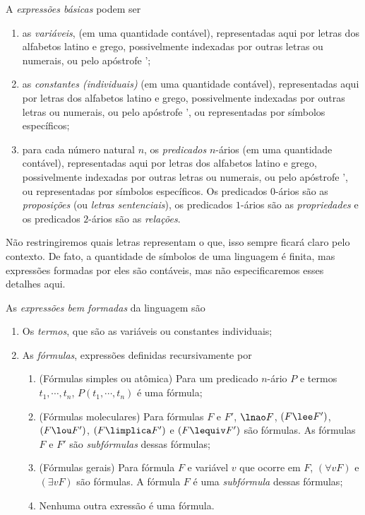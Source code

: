 A \emph{expressões básicas} podem ser
	\begin{enumerate}
	\item as \emph{variáveis}, (em uma quantidade contável), representadas aqui por letras dos alfabetos latino e grego, possivelmente indexadas por outras letras ou numerais, ou pelo apóstrofe ';
	
	\item as \emph{constantes (individuais)} (em uma quantidade contável), representadas aqui por letras dos alfabetos latino e grego, possivelmente indexadas por outras letras ou numerais, ou pelo apóstrofe ', ou representadas por símbolos específicos;
	
	\item para cada número natural $n$, os \emph{predicados} $n$-ários (em uma quantidade contável), representadas aqui por letras dos alfabetos latino e grego, possivelmente indexadas por outras letras ou numerais, ou pelo apóstrofe ', ou representadas por símbolos específicos. Os predicados $0$-ários são as \emph{proposições} (ou \emph{letras sentenciais}), os predicados $1$-ários são as \emph{propriedades} e os predicados $2$-ários são as \emph{relações}.
	\end{enumerate}

Não restringiremos quais letras representam o que, isso sempre ficará claro pelo contexto. De fato, a quantidade de símbolos de uma linguagem é finita, mas expressões formadas por eles são contáveis, mas não especificaremos esses detalhes aqui.

As \emph{expressões bem formadas} da linguagem são
	\begin{enumerate}
	\item Os \emph{termos}, que são as variáveis ou constantes individuais;
	
	\item As \emph{fórmulas}, expressões definidas recursivamente por
		\begin{enumerate}
		\item (Fórmulas simples ou atômica) Para um predicado $n$-ário $P$ e termos $t_1, \cdots, t_n$, $P(t_1,\cdots,t_n)$ é uma fórmula;
		
		\item (Fórmulas moleculares) Para fórmulas $F$ e $F'$, $\lnao F$, $(F \lee F')$, $(F \lou F')$, $(F \limplica F')$ e $(F \lequiv F')$ são fórmulas. As fórmulas $F$ e $F'$ são \emph{subfórmulas} dessas fórmulas;
		
		\item (Fórmulas gerais) Para fórmula $F$ e variável $v$ que ocorre em $F$, $(\forall v F)$ e $(\exists v F)$ são fórmulas. A fórmula $F$ é uma \emph{subfórmula} dessas fórmulas;
		
		\item Nenhuma outra exressão é uma fórmula.
		\end{enumerate}
	\end{enumerate}

